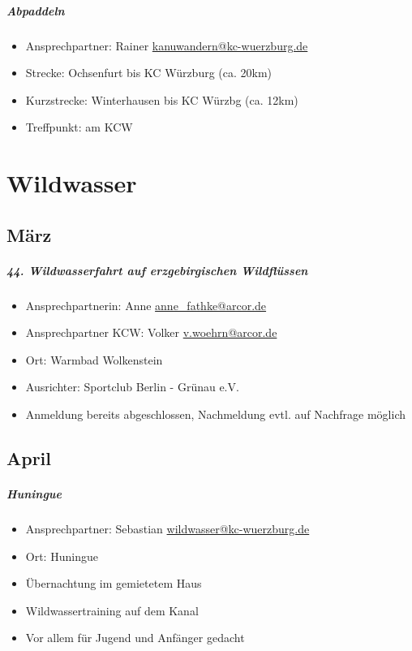 \documentclass[12pt, a4paper]{report}
\begin{document}
\paragraph{Abpaddeln}
\begin{itemize}
    \item Ansprechpartner: Rainer \href{mailto:kanuwandern@kc-wuerzburg.de}{kanuwandern@kc-wuerzburg.de}
    \item Strecke: Ochsenfurt bis KC Würzburg (ca. 20km)
    \item Kurzstrecke: Winterhausen bis KC Würzbg (ca. 12km)
    \item Treffpunkt: am KCW
\end{itemize}


\chapter*{Wildwasser}
\thispagestyle{Wildwasser}
\pagestyle{Wildwasser}
\section*{März}\paragraph{44. Wildwasserfahrt auf erzgebirgischen Wildflüssen}
\begin{itemize}
    \item Ansprechpartnerin: Anne \href{mailto:anne\_fathke@arcor.de}{anne\_fathke@arcor.de}
    \item Ansprechpartner KCW: Volker \href{mailto:v.woehrn@arcor.de}{v.woehrn@arcor.de}
    \item Ort:  Warmbad Wolkenstein
    \item Ausrichter: Sportclub Berlin - Grünau e.V.
    \item Anmeldung bereits abgeschlossen, Nachmeldung evtl. auf Nachfrage möglich
\end{itemize}

\section*{April}\paragraph{Huningue}
\begin{itemize}
    \item Ansprechpartner: Sebastian \href{mailto:wildwasser@kc-wuerzburg.de}{wildwasser@kc-wuerzburg.de}
    \item Ort: Huningue
    \item Übernachtung im gemietetem Haus
    \item Wildwassertraining auf dem Kanal
    \item Vor allem für Jugend und Anfänger gedacht
\end{itemize}
\end{document}
